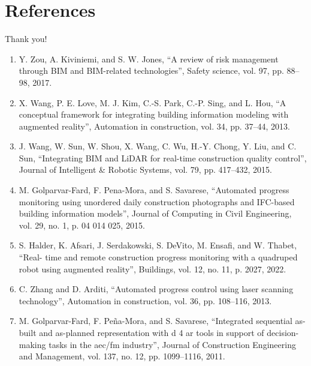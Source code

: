 \documentclass{beamer}%
\begin{document}
\section[References]{References}
\begin{frame}{ }
\begin{changemargin}
\footnotesize

\begin{minipage}[t][0.8715\textheight]{\linewidth}
\begin{center}
Thank you! \vspace{1.5ex}
\end{center}

\scriptsize
\begin{enumerate}

\item<1->[[1\text{]}] Y. Zou, A. Kiviniemi, and S. W. Jones, “A review of risk management through BIM and BIM-related technologies”, Safety science, vol. 97, pp. 88–98, 2017.
\item<1->[[2\text{]}] X. Wang, P. E. Love, M. J. Kim, C.-S. Park, C.-P. Sing, and L. Hou, “A conceptual framework for integrating building information modeling with augmented reality”, Automation in construction, vol. 34, pp. 37–44, 2013.
\item<1->[[3\text{]}] J. Wang, W. Sun, W. Shou, X. Wang, C. Wu, H.-Y. Chong, Y. Liu, and C. Sun, “Integrating BIM and LiDAR for real-time construction quality control”, Journal
of Intelligent & Robotic Systems, vol. 79, pp. 417–432, 2015.
\item<1->[[4\text{]}] M. Golparvar-Fard, F. Pena-Mora, and S. Savarese, “Automated progress monitoring using unordered daily construction photographs and IFC-based building information models”, Journal of Computing in Civil Engineering, vol. 29, no. 1, p. 04 014 025, 2015.
\item<1->[[5\text{]}] S. Halder, K. Afsari, J. Serdakowski, S. DeVito, M. Ensafi, and W. Thabet, “Real- time and remote construction progress monitoring with a quadruped robot using augmented reality”, Buildings, vol. 12, no. 11, p. 2027, 2022.
\item<1->[[6\text{]}] C. Zhang and D. Arditi, “Automated progress control using laser scanning technology”, Automation in construction, vol. 36, pp. 108–116, 2013.
\item<1->[[7\text{]}] M. Golparvar-Fard, F. Peña-Mora, and S. Savarese, “Integrated sequential as-built and as-planned representation with d 4 ar tools in support of decision-making tasks in the aec/fm industry”, Journal of Construction Engineering and Management, vol. 137, no. 12, pp. 1099–1116, 2011.



\end{enumerate}


\vspace{3ex}%
\end{minipage}



\end{changemargin}
\end{frame}
\end{document}
